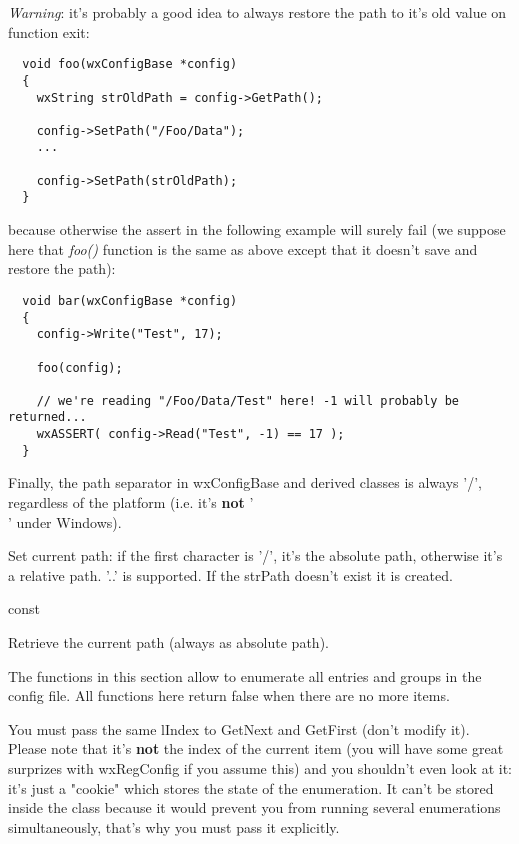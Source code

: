 {\it Warning}: it's probably a good idea to always restore the path to it's
old value on function exit:
\begin{verbatim}
  void foo(wxConfigBase *config)
  {
    wxString strOldPath = config->GetPath();

    config->SetPath("/Foo/Data");
    ...

    config->SetPath(strOldPath);
  }
\end{verbatim}

because otherwise the assert in the following example will surely fail
(we suppose here that {\it foo()} function is the same as above except that it
doesn't save and restore the path):

\begin{verbatim}
  void bar(wxConfigBase *config)
  {
    config->Write("Test", 17);
    
    foo(config);

    // we're reading "/Foo/Data/Test" here! -1 will probably be returned...
    wxASSERT( config->Read("Test", -1) == 17 );
  }
\end{verbatim}

Finally, the path separator in wxConfigBase and derived classes is always '/',
regardless of the platform (i.e. it's {\bf not} '\\' under Windows).


Set current path: if the first character is '/', it's the absolute path,
otherwise it's a relative path. '..' is supported. If the strPath
doesn't exist it is created.

 const

Retrieve the current path (always as absolute path).


The functions in this section allow to enumerate all entries and groups in the
config file. All functions here return false when there are no more items.

You must pass the same lIndex to GetNext and GetFirst (don't modify it).
Please note that it's {\bf not} the index of the current item (you will have
some great surprizes with wxRegConfig if you assume this) and you shouldn't
even look at it: it's just a "cookie" which stores the state of the
enumeration. It can't be stored inside the class because it would prevent you
from running several enumerations simultaneously, that's why you must pass it
explicitly.

